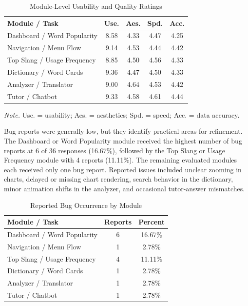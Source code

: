 \begin{table}[!t]
\centering
\caption{Module-Level Usability and Quality Ratings}
\label{tab:module-usability}
\scriptsize
\setlength{\tabcolsep}{2.5pt}
\begin{tabular}{p{}cccc}
\toprule
\textbf{Module / Task} & \textbf{Use.} & \textbf{Aes.} & \textbf{Spd.} & \textbf{Acc.} \\
\midrule
Dashboard / Word Popularity & 8.58 & 4.33 & 4.47 & 4.25 \\
Navigation / Menu Flow & 9.14 & 4.53 & 4.44 & 4.42 \\
Top Slang / Usage Frequency & 8.85 & 4.50 & 4.56 & 4.33 \\
Dictionary / Word Cards & 9.36 & 4.47 & 4.50 & 4.33 \\
Analyzer / Translator & 9.00 & 4.64 & 4.53 & 4.42 \\
Tutor / Chatbot & 9.33 & 4.58 & 4.61 & 4.44 \\
\bottomrule
\end{tabular}
\vspace{2pt}
\begin{flushleft}
\scriptsize
\textit{Note.} Use. = usability; Aes. = aesthetics; Spd. = speed; Acc. = data accuracy.
\end{flushleft}
\end{table}

Bug reports were generally low, but they identify practical areas for refinement. The Dashboard or Word Popularity module received the highest number of bug reports at 6 of 36 responses (16.67\%), followed by the Top Slang or Usage Frequency module with 4 reports (11.11\%). The remaining evaluated modules each received only one bug report. Reported issues included unclear zooming in charts, delayed or missing chart rendering, search behavior in the dictionary, minor animation shifts in the analyzer, and occasional tutor-answer mismatches.

\begin{table}[!t]
\centering
\caption{Reported Bug Occurrence by Module}
\label{tab:bug-results}
\scriptsize
\setlength{\tabcolsep}{4pt}
\begin{tabular}{p{}cc}
\toprule
\textbf{Module / Task} & \textbf{Reports} & \textbf{Percent} \\
\midrule
Dashboard / Word Popularity & 6 & 16.67\% \\
Navigation / Menu Flow & 1 & 2.78\% \\
Top Slang / Usage Frequency & 4 & 11.11\% \\
Dictionary / Word Cards & 1 & 2.78\% \\
Analyzer / Translator & 1 & 2.78\% \\
Tutor / Chatbot & 1 & 2.78\% \\
\bottomrule
\end{tabular}
\end{table}

